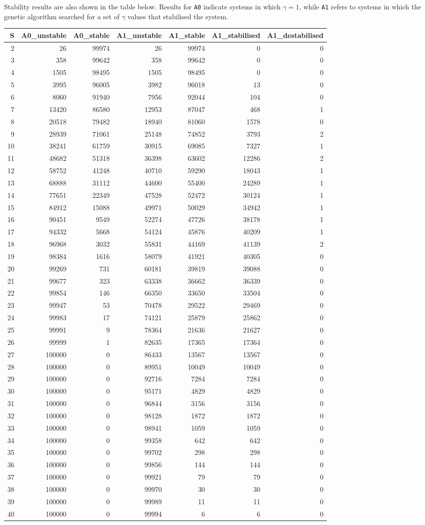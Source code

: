 \documentclass[]{article}
\begin{document}
Stability results are also shown in the table below. Results for
\texttt{A0} indicate systems in which \(\gamma = 1\), while \texttt{A1}
refers to systems in which the genetic algorithm searched for a set of
\(\gamma\) values that stabilised the system.

\begin{longtable}[]{@{}rrrrrrr@{}}
\toprule
S & A0\_unstable & A0\_stable & A1\_unstable & A1\_stable &
A1\_stabilised & A1\_destabilised\tabularnewline
\midrule
\endhead
2 & 26 & 99974 & 26 & 99974 & 0 & 0\tabularnewline
3 & 358 & 99642 & 358 & 99642 & 0 & 0\tabularnewline
4 & 1505 & 98495 & 1505 & 98495 & 0 & 0\tabularnewline
5 & 3995 & 96005 & 3982 & 96018 & 13 & 0\tabularnewline
6 & 8060 & 91940 & 7956 & 92044 & 104 & 0\tabularnewline
7 & 13420 & 86580 & 12953 & 87047 & 468 & 1\tabularnewline
8 & 20518 & 79482 & 18940 & 81060 & 1578 & 0\tabularnewline
9 & 28939 & 71061 & 25148 & 74852 & 3793 & 2\tabularnewline
10 & 38241 & 61759 & 30915 & 69085 & 7327 & 1\tabularnewline
11 & 48682 & 51318 & 36398 & 63602 & 12286 & 2\tabularnewline
12 & 58752 & 41248 & 40710 & 59290 & 18043 & 1\tabularnewline
13 & 68888 & 31112 & 44600 & 55400 & 24289 & 1\tabularnewline
14 & 77651 & 22349 & 47528 & 52472 & 30124 & 1\tabularnewline
15 & 84912 & 15088 & 49971 & 50029 & 34942 & 1\tabularnewline
16 & 90451 & 9549 & 52274 & 47726 & 38178 & 1\tabularnewline
17 & 94332 & 5668 & 54124 & 45876 & 40209 & 1\tabularnewline
18 & 96968 & 3032 & 55831 & 44169 & 41139 & 2\tabularnewline
19 & 98384 & 1616 & 58079 & 41921 & 40305 & 0\tabularnewline
20 & 99269 & 731 & 60181 & 39819 & 39088 & 0\tabularnewline
21 & 99677 & 323 & 63338 & 36662 & 36339 & 0\tabularnewline
22 & 99854 & 146 & 66350 & 33650 & 33504 & 0\tabularnewline
23 & 99947 & 53 & 70478 & 29522 & 29469 & 0\tabularnewline
24 & 99983 & 17 & 74121 & 25879 & 25862 & 0\tabularnewline
25 & 99991 & 9 & 78364 & 21636 & 21627 & 0\tabularnewline
26 & 99999 & 1 & 82635 & 17365 & 17364 & 0\tabularnewline
27 & 100000 & 0 & 86433 & 13567 & 13567 & 0\tabularnewline
28 & 100000 & 0 & 89951 & 10049 & 10049 & 0\tabularnewline
29 & 100000 & 0 & 92716 & 7284 & 7284 & 0\tabularnewline
30 & 100000 & 0 & 95171 & 4829 & 4829 & 0\tabularnewline
31 & 100000 & 0 & 96844 & 3156 & 3156 & 0\tabularnewline
32 & 100000 & 0 & 98128 & 1872 & 1872 & 0\tabularnewline
33 & 100000 & 0 & 98941 & 1059 & 1059 & 0\tabularnewline
34 & 100000 & 0 & 99358 & 642 & 642 & 0\tabularnewline
35 & 100000 & 0 & 99702 & 298 & 298 & 0\tabularnewline
36 & 100000 & 0 & 99856 & 144 & 144 & 0\tabularnewline
37 & 100000 & 0 & 99921 & 79 & 79 & 0\tabularnewline
38 & 100000 & 0 & 99970 & 30 & 30 & 0\tabularnewline
39 & 100000 & 0 & 99989 & 11 & 11 & 0\tabularnewline
40 & 100000 & 0 & 99994 & 6 & 6 & 0\tabularnewline
\bottomrule
\end{longtable}
\end{document}
